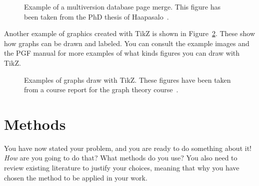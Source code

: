 \documentclass[12pt,a4paper,oneside,pdftex]{report}
\begin{document}
\begin{figure}[ht]
  \begin{center}
    
    \caption{Example of a multiversion database page merge. This figure has
    been taken from the PhD thesis of Haapasalo~\cite{HaapasaloThesis}.}
    \label{fig:page-merge}
  \end{center}
\end{figure}

Another example of graphics created with TikZ is shown in
Figure~\ref{fig:tikz-examples}.
These show how graphs can be drawn and labeled.
You can consult the example images and the PGF manual for more examples of what
kinds figures you can draw with TikZ.

\newlength{\graphdotsize}
\setlength{\graphdotsize}{1.7pt}
\newlength{\graphgridsize}
\setlength{\graphgridsize}{1.2em}
\begin{figure}[ht]
\begin{center}
\caption{Examples of graphs draw with TikZ. These figures have been taken from a
course report for the graph theory course~\cite{FerryProblem}.}
\label{fig:tikz-examples}
\end{center}
\end{figure}



% 

\chapter{Methods}
\label{chapter:methods}

You have now stated your problem, and you are ready to do something
about it!  \emph{How} are you going to do that? What methods do you
use?  You also need to review existing literature to justify your
choices, meaning that why you have chosen the method to be applied in
your work.
\end{document}
